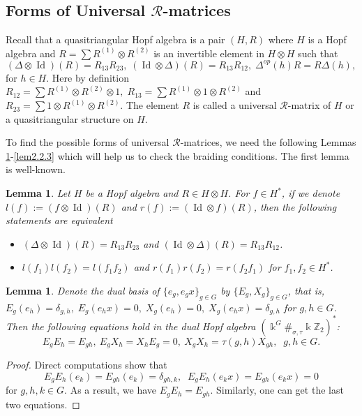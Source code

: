 \documentclass[a4paper,11pt]{amsart}
\def \id{\operatorname{Id}}
\def \id{\operatorname{Id}}
\numberwithin{equation}{section}
\newtheorem{lemma}[theorem]{Lemma}
\begin{document}
\subsection{Forms of Universal $\mathcal{R}$-matrices}
Recall that a quasitriangular Hopf algebra is a pair $(H, R)$ where $H$ is a Hopf algebra and $R=\sum R^{(1)} \otimes R^{(2)}$ is an invertible element in $H\otimes H$ such that
\begin{equation*}
 (\Delta \otimes \id)(R)=R_{13}R_{23},\; (\id \otimes \Delta)(R)=R_{13}R_{12},\;\Delta^{op}(h)R=R\Delta(h),
 \end{equation*}
for $h\in H$. Here by definition $R_{12}= \sum R^{(1)} \otimes R^{(2)}\otimes 1,\; R_{13}= \sum R^{(1)}\otimes 1 \otimes R^{(2)}$ and
$R_{23}=\sum 1 \otimes R^{(1)}\otimes R^{(2)}$. The element $R$ is called a universal $\mathcal{R}$-matrix of $H$ or a quasitriangular structure on $H$.

To find the possible forms of universal $\mathcal{R}$-matrices, we need the following Lemmas \ref{lem2.2.1}-\ref{lem2.2.3} which will help us to check the braiding conditions. The first lemma is well-known.
\begin{lemma}\cite[Proposition 12.2.11]{R}\label{lem2.2.1}
Let $H$ be a Hopf algebra and $R \in H\otimes H$. For $f \in H^*$, if we denote $l(f):=(f \otimes \id)(R)$ and $r(f):=(\id \otimes f)(R)$, then the following statements are equivalent
\begin{itemize}
\item[(i)] $(\Delta \otimes \id)(R)=R_{13}R_{23}$ and $(\id \otimes \Delta)(R)=R_{13}R_{12}$.
\item[(ii)] $l(f_1)l(f_2)=l(f_1f_2)$ and $r(f_1)r(f_2)=r(f_2f_1) $ for $f_1,f_2 \in H^*$.
\end{itemize}
\end{lemma}

\begin{lemma}\label{lem2.2.2}
 Denote the dual basis of $\{e_g,e_gx\}_{g\in G}$ by $\{E_g,X_g\}_{g\in G}$, that is,
$E_g(e_h)=\delta_{g,h},\;E_g(e_hx)=0,\;X_g(e_h)=0,\;X_g(e_hx)=\delta_{g,h}$ for $g,h\in G$. Then the following equations hold in the dual Hopf algebra $(\Bbbk^G\#_{\sigma,\tau}\Bbbk \mathbb{Z}_2)^{*}$:
\begin{equation*}
E_gE_h=E_{gh},\ E_gX_h=X_hE_g=0,\ X_gX_h=\tau(g,h)X_{gh}, \;\; g,h\in G.
\end{equation*}
\end{lemma}
\begin{proof} Direct computations show that
$$E_gE_h(e_k)=E_{gh}(e_k)=\delta_{gh,k},\;\;E_gE_h(e_kx)=E_{gh}(e_kx)=0$$
 for $g,h,k\in G$. As a result, we have $E_gE_h=E_{gh}$. Similarly, one can get the last two equations.
\end{proof}
\end{document}
